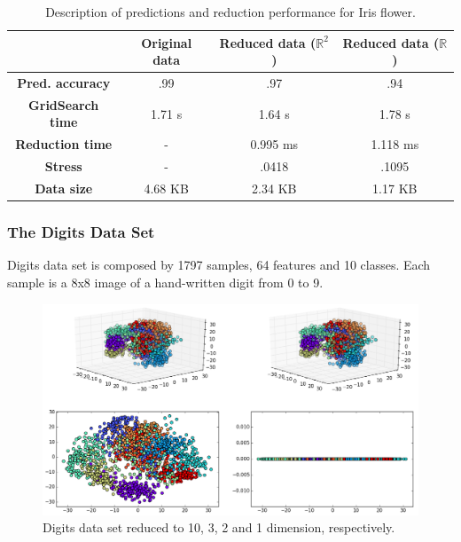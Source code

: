 \documentclass[12pt]{article}
\begin{document}
\begin{table}[H]
	\centering

	\begin{tabular}{|c|c|c|c|}
		\hline
		& \textbf{Original data} & \textbf{Reduced data ($\mathbb{R}^2$)} & \textbf{Reduced data ($\mathbb{R}$)} \\\hline
		\textbf{Pred. accuracy} & .99 & .97 & .94 \\\hline
		\textbf{GridSearch time} & 1.71 s & 1.64 s & 1.78 s \\\hline
		\textbf{Reduction time} & - & 0.995 ms & 1.118 ms \\\hline
		\textbf{Stress} & - & .0418 & .1095 \\\hline
		\textbf{Data size} & 4.68 KB & 2.34 KB & 1.17 KB \\\hline
	\end{tabular}

	\caption{Description of predictions and reduction performance for Iris flower.}
\end{table}

\subsubsection{The Digits Data Set}

Digits data set is composed by 1797 samples, 64 features and 10 classes. Each sample is a 8x8 image of a hand-written digit from 0 to 9.

\begin{figure}[H]
	\centering
	\captionsetup{justification=centering}
	\includegraphics[width=\linewidth]{experiments/1_3_digits_pca}
	\caption{Digits data set reduced to 10, 3, 2 and 1 dimension, respectively.}
	\label{fig:dsdigitspca}
\end{figure}
\end{document}
